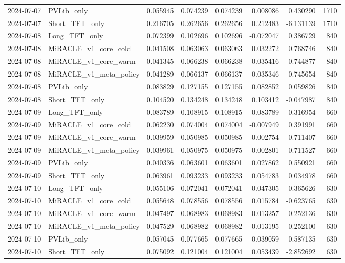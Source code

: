 \begin{tabular}{llrrrrrr}
2024-07-07 & PVLib_only & 0.055945 & 0.074239 & 0.074239 & 0.008086 & 0.430290 & 1710 \\
2024-07-07 & Short_TFT_only & 0.216705 & 0.262656 & 0.262656 & 0.212483 & -6.131139 & 1710 \\
2024-07-08 & Long_TFT_only & 0.072399 & 0.102696 & 0.102696 & -0.072047 & 0.386729 & 840 \\
2024-07-08 & MiRACLE_v1_core_cold & 0.041508 & 0.063063 & 0.063063 & 0.032272 & 0.768746 & 840 \\
2024-07-08 & MiRACLE_v1_core_warm & 0.041345 & 0.066238 & 0.066238 & 0.035416 & 0.744877 & 840 \\
2024-07-08 & MiRACLE_v1_meta_policy & 0.041289 & 0.066137 & 0.066137 & 0.035346 & 0.745654 & 840 \\
2024-07-08 & PVLib_only & 0.083829 & 0.127155 & 0.127155 & 0.082852 & 0.059826 & 840 \\
2024-07-08 & Short_TFT_only & 0.104520 & 0.134248 & 0.134248 & 0.103412 & -0.047987 & 840 \\
2024-07-09 & Long_TFT_only & 0.083789 & 0.108915 & 0.108915 & -0.083789 & -0.316954 & 660 \\
2024-07-09 & MiRACLE_v1_core_cold & 0.062230 & 0.074004 & 0.074004 & -0.007949 & 0.391991 & 660 \\
2024-07-09 & MiRACLE_v1_core_warm & 0.039959 & 0.050985 & 0.050985 & -0.002754 & 0.711407 & 660 \\
2024-07-09 & MiRACLE_v1_meta_policy & 0.039961 & 0.050975 & 0.050975 & -0.002801 & 0.711527 & 660 \\
2024-07-09 & PVLib_only & 0.040336 & 0.063601 & 0.063601 & 0.027862 & 0.550921 & 660 \\
2024-07-09 & Short_TFT_only & 0.063961 & 0.093233 & 0.093233 & 0.054783 & 0.034978 & 660 \\
2024-07-10 & Long_TFT_only & 0.055106 & 0.072041 & 0.072041 & -0.047305 & -0.365626 & 630 \\
2024-07-10 & MiRACLE_v1_core_cold & 0.055648 & 0.078556 & 0.078556 & 0.015784 & -0.623765 & 630 \\
2024-07-10 & MiRACLE_v1_core_warm & 0.047497 & 0.068983 & 0.068983 & 0.013257 & -0.252136 & 630 \\
2024-07-10 & MiRACLE_v1_meta_policy & 0.047529 & 0.068982 & 0.068982 & 0.013195 & -0.252100 & 630 \\
2024-07-10 & PVLib_only & 0.057045 & 0.077665 & 0.077665 & 0.039059 & -0.587135 & 630 \\
2024-07-10 & Short_TFT_only & 0.075092 & 0.121004 & 0.121004 & 0.053439 & -2.852692 & 630 \\

\end{tabular}

